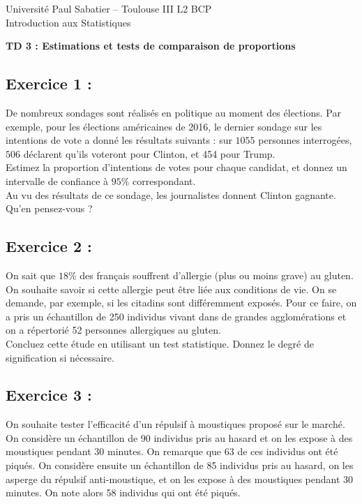 \documentclass{article}
\numberwithin{equation}{section}
\begin{document}
\noindent Université Paul Sabatier -- Toulouse III
\hfill L2 BCP\\
\noindent Introduction aux Statistiques

\bigskip
\bigskip


\begin{center}
{\bf \large TD 3 : Estimations et tests de comparaison de proportions}\\
{\bf \large }
\end{center}

\bigskip
\bigskip


\subsection*{ Exercice 1 : } 
De nombreux sondages sont réalisés en politique au moment des élections. Par exemple, pour les élections américaines de 2016, le dernier sondage sur les intentions de vote a donné les résultats suivants : sur $1055$ personnes interrogées, $506$ déclarent qu'ils voteront pour Clinton, et 454 pour Trump. \\
Estimez la proportion d'intentions de votes pour chaque candidat, et donnez un intervalle de confiance à $95 \%$ correspondant.\\
Au vu des résultats de ce sondage, les journalistes donnent Clinton gagnante. Qu'en pensez-vous ?  \\

\bigskip 

\subsection*{ Exercice 2 : } 
On sait que $18\%$ des fran\c{c}ais souffrent d'allergie (plus ou moins grave) au gluten. 
On souhaite savoir si cette allergie peut être liée aux conditions de vie. On se demande, par exemple,
si les citadins sont différemment exposés. 
Pour ce faire, on a pris un échantillon de 250 individus vivant dans de grandes agglomérations
et on a répertorié 52 personnes allergiques au gluten. \\
Concluez cette étude en utilisant un test statistique. 
Donnez le degré de signification si nécessaire. \\

\bigskip 


\subsection*{ Exercice 3 : }
On souhaite tester l'efficacité d'un répulsif à moustiques proposé sur le marché. 
On considère un échantillon de 90 individus pris au hasard et on les expose à des moustiques pendant 30 minutes. On remarque que 63 de ces individus ont été piqués.
On considère ensuite un échantillon de 85 individus pris au hasard, on les asperge du répulsif anti-moustique, et on les expose à des moustiques pendant 30 minutes. On note alors 58 individus qui ont été piqués.
\end{document}
